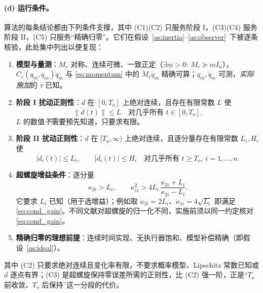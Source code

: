 \paragraph{(d) 运行条件。}
算法的每条结论都由下列条件支撑，其中 \textup{(C1)(C2)} 只服务阶段 I，\textup{(C3)(C4)} 服务阶段 II，\textup{(C5)} 只服务“精确归零”。它们在假设~\ref{as:inertia}--\ref{as:observer}~下被逐条核验，此处集中列出以便复现：

\begin{enumerate}
\item[\textup{(C1)}] \textbf{模型与量测}：\(M_e\) 对称、连续可微、一致正定（\(\exists\underline m>0:\ M_e\succeq\underline m I_n\)），\(C_e(q_m,\dot q_m)\dot q_m\) 与 \eqref{eq:momentum} 中的 \(\dot M_e\dot q_m\) 精确可算；\(q_m,\dot q_m\) 可测，\emph{实际施加}的 \(\tau\) 已知。
\item[\textup{(C2)}] \textbf{阶段 I 扰动正则性}：\(d\) 在 \([0,T_o]\) 上绝对连续，且存在有限常数 \(L\) 使
\begin{equation}
\|\dot d(t)\|\le L\quad\text{对几乎所有 }t\in[0,T_o].
\label{eq:cond_L}
\end{equation}
\(L\) 的数值\emph{不}需要预先知道，只要求有限。
\item[\textup{(C3)}] \textbf{阶段 II 扰动正则性}：\(d\) 在 \([T_o,\infty)\) 上绝对连续，且逐分量存在有限常数 \(L_i,H_i\) 使
\begin{equation}
\lvert\dot d_i(t)\rvert\le L_i,\qquad
\lvert\ddot d_i(t)\rvert\le H_i
\quad\text{对几乎所有 }t\ge T_o,\ i=1,\dots,n .
\label{eq:cond_sta}
\end{equation}
\item[\textup{(C4)}] \textbf{超螺旋增益条件}：逐分量
\begin{equation}
\kappa_{2i}>L_i,\qquad
\kappa_{1i}^{2}>4L_i\,\frac{\kappa_{2i}+L_i}{\kappa_{2i}-L_i}.
\label{eq:cond_gain}
\end{equation}
它要求 \(L_i\) 已知（用于选增益）；例如取 \(\kappa_{2i}=2L_i\)、\(\kappa_{1i}=4\sqrt{L_i}\) 即满足 \eqref{eq:cond_gain}。不同文献对超螺旋的归一化不同，实施前须以同一约定核对 \eqref{eq:cond_gain}。
\item[\textup{(C5)}] \textbf{精确归零的理想前提}：连续时间实现、无执行器饱和、模型补偿精确（即假设~\ref{as:ideal}）。
\end{enumerate}

其中 \textup{(C2)} 只要求绝对连续且变化率有限，不要求概率模型、Lipschitz 常数已知或 \(d\) 逐点有界；\textup{(C3)} 是超螺旋保持零误差所需的正则性，比 \textup{(C2)} 强一阶，正是“\(T_o\) 前收敛、\(T_o\) 后保持”这一分段的代价。

